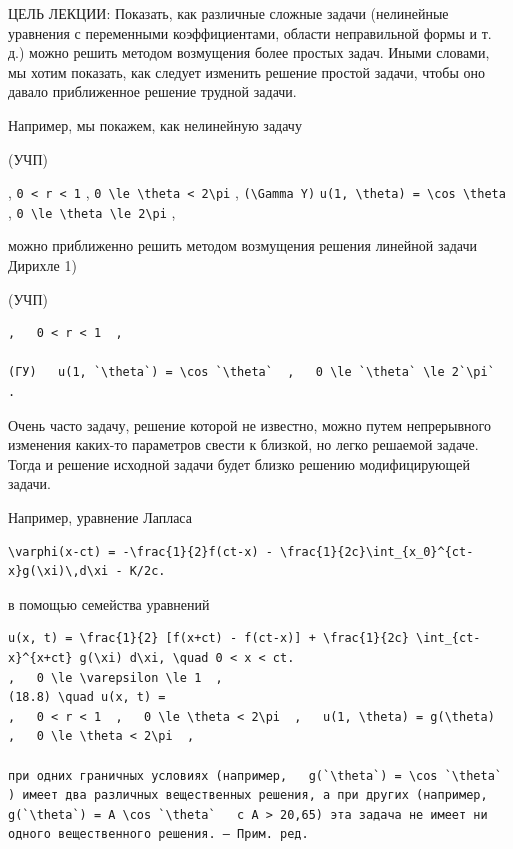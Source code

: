 \documentclass[
  ukrainian,
]{article}
\begin{document}
ЦЕЛЬ ЛЕКЦИИ: Показать, как различные сложные задачи (нелинейные
уравнения с переменными коэффициентами, области неправильной формы и т.
д.) можно решить методом возмущения более простых задач. Иными словами,
мы хотим показать, как следует изменить решение простой задачи, чтобы
оно давало приближенное решение трудной задачи.

Например, мы покажем, как нелинейную задачу

(УЧП)

, \texttt{0\ \textless{}\ r\ \textless{}\ 1} ,
\texttt{0\ \textbackslash{}le\ \textbackslash{}theta\ \textless{}\ 2\textbackslash{}pi}
, \texttt{(\textbackslash{}Gamma\ Y)}
\texttt{u(1,\ \textbackslash{}theta)\ =\ \textbackslash{}cos\ \textbackslash{}theta}
,
\texttt{0\ \textbackslash{}le\ \textbackslash{}theta\ \textbackslash{}le\ 2\textbackslash{}pi}
,

можно приближенно решить методом возмущения решения линейной задачи
Дирихле 1)

(УЧП)

\begin{verbatim}
,   0 < r < 1  ,

(ГУ)   u(1, `\theta`) = \cos `\theta`  ,   0 \le `\theta` \le 2`\pi`  .
\end{verbatim}

Очень часто задачу, решение которой не известно, можно путем
непрерывного изменения каких-то параметров свести к близкой, но легко
решаемой задаче. Тогда и решение исходной задачи будет близко решению
модифицирующей задачи.

Например, уравнение Лапласа

\begin{verbatim}
\varphi(x-ct) = -\frac{1}{2}f(ct-x) - \frac{1}{2c}\int_{x_0}^{ct-x}g(\xi)\,d\xi - K/2c.
\end{verbatim}

в помощью семейства уравнений

\begin{verbatim}
u(x, t) = \frac{1}{2} [f(x+ct) - f(ct-x)] + \frac{1}{2c} \int_{ct-x}^{x+ct} g(\xi) d\xi, \quad 0 < x < ct.
,   0 \le \varepsilon \le 1  ,
(18.8) \quad u(x, t) =
,   0 < r < 1  ,   0 \le \theta < 2\pi  ,   u(1, \theta) = g(\theta)  ,   0 \le \theta < 2\pi  ,

при одних граничных условиях (например,   g(`\theta`) = \cos `\theta`  ) имеет два различных вещественных решения, а при других (например,   g(`\theta`) = A \cos `\theta`   с A > 20,65) эта задача не имеет ни одного вещественного решения. — Прим. ред.
\end{verbatim}
\end{document}
